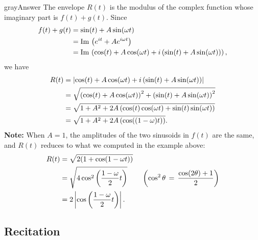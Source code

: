 \begin{mybox}{gray}{Answer}
  The envelope $R(t)$ is the modulus of the complex function whose imaginary part is
  $f(t)+g(t)$. Since
  \begin{align*}
    \displaystyle  \displaystyle f(t)+g(t)
    \displaystyle &= \displaystyle \sin (t)+A \sin (\omega t) \\
    \displaystyle &= \displaystyle  \mathrm{Im\, }\left(e^{it} +A e^{i\omega t}\right) \\
    \displaystyle &= \displaystyle \mathrm{Im\, }
                    \left(\cos (t)+A\cos (\omega t) +i \left(\sin (t)+A\sin (\omega t)\right)\right),
  \end{align*}
  we have
  \begin{align*}
    \displaystyle  \displaystyle R(t)
    \displaystyle &= \displaystyle
                    \left|\cos (t)+A\cos (\omega t) +i \left(\sin (t)+A\sin (\omega t)\right)\right| \\
    \displaystyle &= \displaystyle \sqrt
                    {\left(\cos (t)+A\cos (\omega t)\right)^2 +
                    \left(\sin (t)+A\sin (\omega t)\right)^2 } \\
    \displaystyle &= \displaystyle
                    \sqrt { 1 + A^2+2 A\left(\cos (t)\cos (\omega t)
                    +\sin (t)\sin (\omega t)\right) } \\
    \displaystyle &= \displaystyle \sqrt { 1 + A^2+2 A\left(\cos ((1-\omega ) t)\right)}.
  \end{align*}
  \textbf{Note:} When $A=1$, the amplitudes of the two sinusoids in $f(t)$ are the same,
  and $R(t)$ reduces to what we computed in the example above:
  \begin{align*}
    \displaystyle  \displaystyle R(t)
    \displaystyle &= \displaystyle  \sqrt {2(1+\cos (1-\omega t))} \\
    \displaystyle &= \displaystyle  \sqrt {4\cos ^2\left(\frac{1-\omega }{2}t\right)}\qquad
                    \left(\cos ^2\theta \, =\, \frac{\cos (2\theta )+1}{2}\right) \\
    \displaystyle &= \displaystyle  2 \left|\cos \left(\frac{1-\omega }{2}t\right)\right|.
  \end{align*}
\end{mybox}
\clearpage

\subsection{Recitation}
